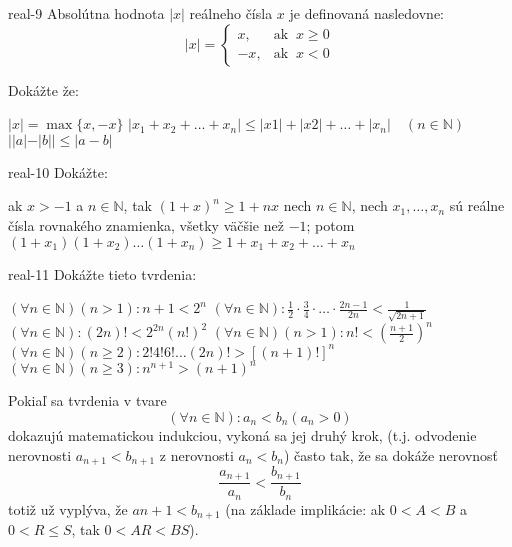 \begin{defproblem}{real-9}
  Absolútna hodnota $|x|$ reálneho čísla $x$ je definovaná nasledovne:
  \[
    |x| =
      \begin{cases}
        x,  & \text{ak } ~x \geq 0 \\
        -x, & \text{ak } ~x < 0
      \end{cases}
  \]
  \begin{samepage}
  Dokážte že:
  \begin{tasks}
    \task $|x| = \max{\{x, -x\}}$
    \task $|x_1 + x_2 + \ldots + x_n| \leq |x1| + |x2| + \ldots + |x_n| \quad (n \in \mathbb{N})$
    \task $||a| - |b|| \leq |a - b|$
  \end{tasks}
  \end{samepage}
  \end{defproblem}

\begin{defproblem}{real-10}
Dokážte:

\begin{tasks}
  \task ak $x > -1$ a $n \in \mathbb{N}$, tak $(1 + x)^n \geq 1 + nx$
  \task
    nech $n \in \mathbb{N}$, nech $x_1, \ldots, x_n$ sú reálne čísla rovnakého
    znamienka, všetky väčšie než $-1$; potom $(1 + x_1)(1 + x_2) \ldots (1 +
    x_n) \geq 1 + x_1 + x_2 + \ldots + x_n$
\end{tasks}
\end{defproblem}

\begin{defproblem}{real-11}
Dokážte tieto tvrdenia:
\begin{tasks}
  \task
    $(\forall n \in \mathbb{N})(n > 1): n + 1 < 2^n$
  \task
    $(\forall n \in \mathbb{N}): \frac{1}{2} \cdot \frac{3}{4} \cdot \ldots
    \cdot \frac{2n - 1}{2n} < \frac{1}{\sqrt{2n + 1}}$
  \task
    $(\forall n \in \mathbb{N}): (2n)! < 2^{2n} (n!)^2$
  \task
    $(\forall n \in \mathbb{N})(n > 1): n! < (\frac{n + 1}{2})^n$
  \task
    $(\forall n \in \mathbb{N})(n \geq 2): 2! 4! 6! \ldots (2n)!
    > [(n+1)!]^n$
  \task
    $(\forall n \in \mathbb{N})(n \geq 3): n^{n+1} > (n+1)^n$
\end{tasks}

\begin{solution}
Pokiaľ sa tvrdenia v tvare
\[
  (\forall n \in \mathbb{N}): a_n < b_n (a_n > 0)
\]
dokazujú matematickou indukciou, vykoná sa jej druhý krok, (t.j. odvodenie
nerovnosti $a_{n+1} < b_{n+1}$ z nerovnosti $a_n < b_n$) často tak, že sa dokáže
nerovnosť
\[
  \frac{a_{n + 1}}{a_n} < \frac{b_{n + 1}}{b_n}
\]
totiž už vyplýva, že $a{n + 1} < b_{n+1}$ (na základe implikácie: ak $0 < A < B$
a $0 < R \leq S$, tak  $0 < AR < BS$).
\end{solution}
\end{defproblem}


